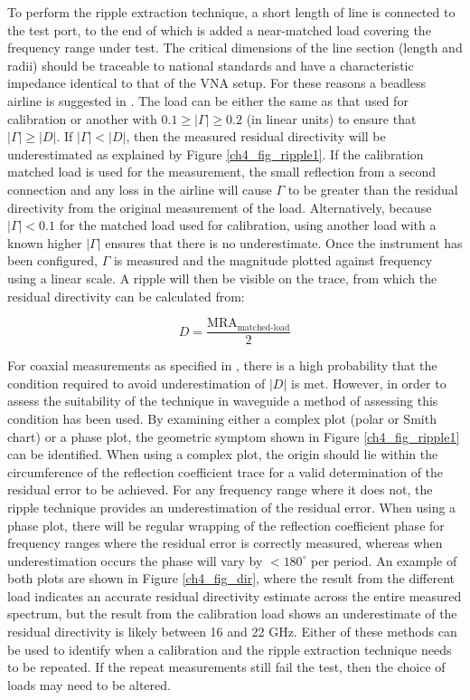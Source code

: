\documentclass[../thesis/thesis.tex]{subfiles}
\begin{document}
\begin{refsection}
To perform the ripple extraction technique, a short length of line is connected to the test port, to the end of which is added a near-matched load covering the frequency range under test. The critical dimensions of the line section (length and radii) should be traceable to national standards and have a characteristic impedance
identical to that of the VNA setup. For these reasons a beadless airline is suggested in \cite{EURAMET_2011}. The load can be either the same as that used for calibration or another with $0.1 \ge |\Gamma| \ge 0.2$ (in linear units) to ensure that $|\Gamma| \ge |D|$. If $|\Gamma| < |D|$, then the measured residual directivity will be underestimated as explained by Figure \ref{ch4_fig_ripple1}. If the calibration matched load is used for the measurement, the small reflection from a second connection and any loss in the airline will cause $\Gamma$ to be greater than the residual directivity from the original measurement of the load. Alternatively, because $|\Gamma| < 0.1$ for the matched load used for calibration, using another load with a known higher $|\Gamma|$ ensures that there is no underestimate. Once the instrument has been configured, $\Gamma$ is measured and the magnitude plotted against frequency using a linear scale. A ripple will then be visible on the trace, from which the residual directivity can be calculated from:

\begin{equation}
D = \frac{\textrm{MRA}_\textrm{matched-load}}{2}
\end{equation}

For coaxial measurements as specified in \cite{EURAMET_2011}, there is a high probability that the condition required to avoid underestimation of $|D|$ is met. However, in order to assess the suitability of the technique in waveguide a method of assessing this condition has been used. By examining either a complex plot (polar or Smith chart) or a phase plot, the geometric symptom shown in Figure \ref{ch4_fig_ripple1} can be identified. When using a complex plot, the origin should lie within the circumference of the reflection coefficient trace for a valid determination of the residual error to be achieved. For any frequency range where it does not, the ripple technique provides an underestimation of the residual error. When using a phase plot, there will be regular wrapping of the reflection coefficient phase for frequency ranges where the residual error is correctly measured, whereas when underestimation occurs the phase will vary by $<180^\circ$ per period. An example of both plots are shown in Figure \ref{ch4_fig_dir}, where the result from the different load indicates an accurate residual directivity estimate across the entire measured spectrum, but the result from the calibration load shows an underestimate of the residual directivity is likely between 16 and 22 GHz. Either of these methods can be used to identify when a calibration and the ripple extraction technique needs to be repeated. If the repeat measurements still fail the test, then the choice of loads may need to be altered. 


\end{refsection}
\end{document}
